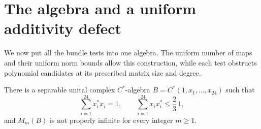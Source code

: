 \section{The algebra and a uniform additivity defect}
\label{sec:algebra}

We now put all the bundle tests into one algebra.  The uniform number of
maps and their uniform norm bounds allow this construction, while each
test obstructs polynomial candidates at its prescribed matrix size and
degree.

\begin{theorem}
\label{thm:construction}
There is a separable unital complex $C^*$-algebra
$B=C^*(1,x_1,\ldots,x_{24})$ such that
\begin{equation}
  \sum_{i=1}^{24}x_i^*x_i=1,
  \qquad
  \sum_{i=1}^{24}x_ix_i^*\le\frac23\,1,
  \label{eq:algebra-relations}
\end{equation}
and $M_m(B)$ is not properly infinite for every integer $m\ge1$.
\end{theorem}

